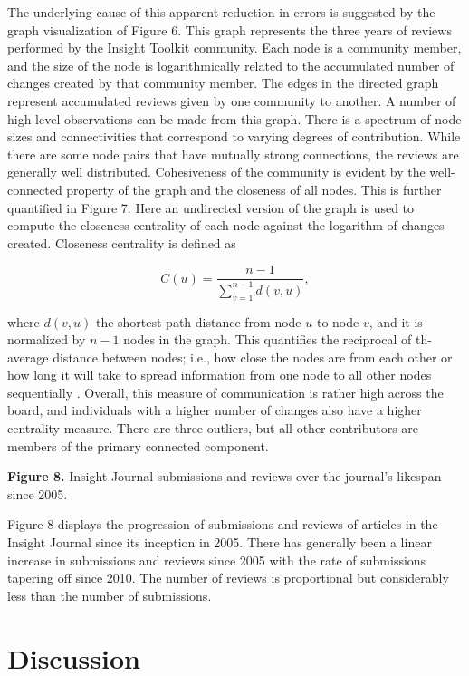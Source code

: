 \documentclass{frontiersENG} %
\begin{document}
The underlying cause of this apparent reduction in errors is suggested by the
graph visualization of Figure 6. This graph represents
the three years of reviews performed by the Insight Toolkit community. Each
node is a community member, and the size of the node is logarithmically
related to the accumulated number of changes created by that community member.
The edges in the directed graph represent accumulated reviews given by one
community to another. A number of high level observations can be made from
this graph.  There is a spectrum of node sizes and connectivities that
correspond to varying degrees of contribution. While there are some node pairs
that have mutually strong connections, the reviews are generally well
distributed.  Cohesiveness of the community is evident by the well-connected
property of the graph and the closeness of all nodes.  This is further
quantified in Figure 7.  Here an undirected version
of the graph is used to compute the closeness centrality of each node against
the logarithm of changes created.  Closeness centrality is defined
as \cite{Freeman1979}

\begin{equation}
   C(u) = \frac{n - 1}{\sum_{v=1}^{n-1} d(v, u)},
\end{equation}

where $d(v, u)$ the shortest path distance from node $u$ to node $v$, and it
is normalized by $n-1$ nodes in the graph. This quantifies the reciprocal of th-
average distance between nodes; i.e., how close the nodes are from each other
or how long it will take to spread information from one node to all other
nodes sequentially \cite{Newman2005}. Overall, this measure of communication is
rather high across the board, and individuals with a higher
number of changes also have a higher centrality measure.  There are three
outliers, but all other contributors are members of the primary connected
component.

\textbf{Figure 8. }{Insight Journal submissions and reviews over the journal's
likespan since 2005.} \label{fig:08}

Figure 8 displays the progression of submissions and reviews of articles in the
Insight Journal since its inception in 2005.  There has generally been a linear
increase in submissions and reviews since 2005 with the rate of submissions
tapering off since 2010.  The number of reviews is proportional but
considerably less than the number of submissions.




\section{Discussion}
\end{document}
